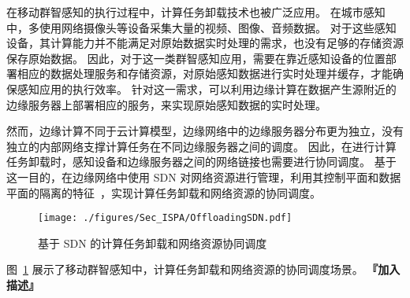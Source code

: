 在移动群智感知的执行过程中，计算任务卸载技术也被广泛应用。
在城市感知中，多使用网络摄像头等设备采集大量的视频、图像、音频数据。
对于这些感知设备，其计算能力并不能满足对原始数据实时处理的需求，也没有足够的存储资源保存原始数据。
因此，对于这一类群智感知应用，需要在靠近感知设备的位置部署相应的数据处理服务和存储资源，对原始感知数据进行实时处理并缓存，才能确保感知应用的执行效率。
针对这一需求，可以利用边缘计算在数据产生源附近的边缘服务器上部署相应的服务，来实现原始感知数据的实时处理。


然而，边缘计算不同于云计算模型，边缘网络中的边缘服务器分布更为独立，没有独立的内部网络支撑计算任务在不同边缘服务器之间的调度。
因此，在进行计算任务卸载时，感知设备和边缘服务器之间的网络链接也需要进行协同调度。
基于这一目的，在边缘网络中使用 SDN 对网络资源进行管理，利用其控制平面和数据平面的隔离的特征~\cite{Committee:2012un}，实现计算任务卸载和网络资源的协同调度。


\begin{figure}[!h]
  \centering
  \texttt{[image: ./figures/Sec\_ISPA/OffloadingSDN.pdf]}
  \vspace{-1em}
  \caption{基于 SDN 的计算任务卸载和网络资源协同调度}
  \vspace{-1em}
  \label{fig_OffloadingSDN}
\end{figure}

图~\ref{fig_OffloadingSDN} 展示了移动群智感知中，计算任务卸载和网络资源的协同调度场景。
\textbf{『加入描述』}

